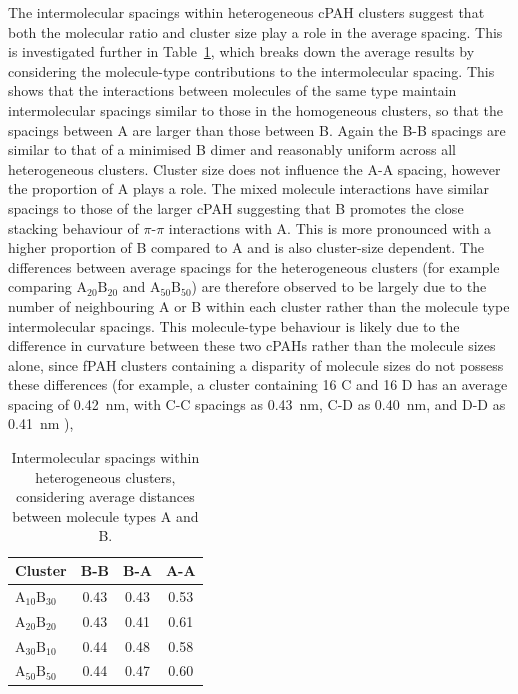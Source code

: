 The intermolecular spacings within heterogeneous cPAH clusters suggest that both the molecular ratio and cluster size play a role in the average spacing. This is investigated further in Table~\ref{table:mixedintermolecdists}, which breaks down the average results by considering the molecule-type contributions to the intermolecular spacing. This shows that the interactions between molecules of the same type maintain intermolecular spacings similar to those in the homogeneous clusters, so that the spacings between A are larger than those between B. Again the B-B spacings are similar to that of a minimised B dimer and reasonably uniform across all heterogeneous clusters.  %
Cluster size does not influence the A-A spacing, however the proportion of A plays a role. The mixed molecule interactions have similar spacings to those of the larger cPAH suggesting that B promotes the close stacking behaviour of $\pi$-$\pi$ interactions with A. This is more pronounced with a higher proportion of B compared to A and is also cluster-size dependent. The differences between average spacings for the heterogeneous clusters (for example comparing $\text{A}_{\text{20}}\text{B}_{\text{20}}$ and $\text{A}_{\text{50}}\text{B}_{\text{50}}$) are therefore observed to be largely due to the number of neighbouring A or B within each cluster rather than the molecule type intermolecular spacings. %
This molecule-type behaviour is likely due to the difference in curvature between these two cPAHs rather than the molecule sizes alone, since fPAH clusters containing a disparity of molecule sizes do not possess these differences (for example, a cluster containing 16 C and 16 D has an average spacing of 0.42~nm, with C-C spacings as 0.43~nm, C-D as 0.40~nm, and D-D as 0.41~nm \cite{bowal2018partitioning}), 

%
\begin{table}[thb]
\centering
\caption{Intermolecular spacings within heterogeneous clusters, considering average distances between molecule types A and B.}
\label{table:mixedintermolecdists}
\begin{tabular}{lccc}
\hline
Cluster & B-B & B-A & A-A \\ \hline
$\text{A}_{\text{10}}\text{B}_{\text{30}}$ & 0.43 & 0.43 & 0.53 \\
$\text{A}_{\text{20}}\text{B}_{\text{20}}$ & 0.43 & 0.41 & 0.61 \\
$\text{A}_{\text{30}}\text{B}_{\text{10}}$ & 0.44 & 0.48 & 0.58 \\
$\text{A}_{\text{50}}\text{B}_{\text{50}}$ & 0.44 & 0.47 & 0.60 \\
\hline
\end{tabular}
\end{table}

